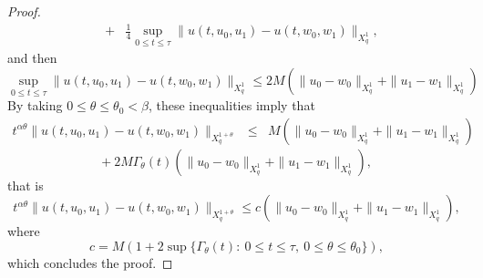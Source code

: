 \documentclass[12pt,reqno]{amsart}
\newtheorem{theorem}{Theorem}
\begin{document}
\begin{proof}
\begin{eqnarray*}
		&+& \frac{1}{4}\sup_{0\le t\le \tau}\|u(t,u_0,u_1)-u(t,w_0,w_1)\|_{X^{1}_{q}},
	\end{eqnarray*}
and then
	$$\sup_{0\le t\le \tau}\|u(t,u_0,u_1)-u(t,w_0,w_1)\|_{X^{1}_{q}} \le 2M\left(\|u_0-w_0\|_{X^{1}_{q}}+\|u_1-w_1\|_{X^{1}_{q}}\right)$$
	By taking $0\le\theta\le\theta_0<\beta$, these inequalities imply that
	\begin{eqnarray*}
		t^{\alpha\theta} \|u(t,u_0,u_1)-u(t,w_0,w_1)\|_{X^{1+\theta}_{q}} &\le& M\left(\|u_0-w_0\|_{X^{1}_{q}}+\|u_1-w_1\|_{X^{1}_{q}}\right)
	\end{eqnarray*}
	$$+\ 2M\Gamma_{\theta}(t)\left(\|u_0-w_0\|_{X^{1}_{q}}+\|u_1-w_1\|_{X^{1}_{q}}\right),$$
	that is
	$$t^{\alpha\theta} \|u(t,u_0,u_1)-u(t,w_0,w_1)\|_{X^{1+\theta}_{q}} \le c\left(\|u_0-w_0\|_{X^{1}_{q}}+\|u_1-w_1\|_{X^{1}_{q}}\right),$$
	where
	$$c=M(1+2\sup\{\Gamma_{\theta}(t):\ 0\le t\le \tau,\ 0\le\theta\le\theta_0 \}),$$
	which concludes the proof.
\end{proof}



\end{document}
